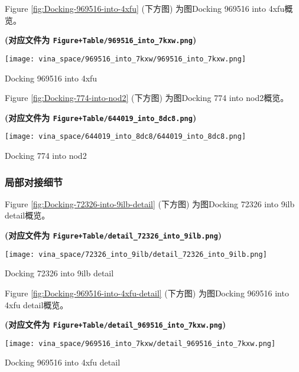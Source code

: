 \documentclass[
]{article}
\begin{document}
Figure \ref{fig:Docking-969516-into-4xfu} (下方图) 为图Docking 969516 into 4xfu概览。

\textbf{(对应文件为 \texttt{Figure+Table/969516\_into\_7kxw.png})}

\def\@captype{figure}
\begin{center}
\texttt{[image: vina\_space/969516\_into\_7kxw/969516\_into\_7kxw.png]}
\caption{Docking 969516 into 4xfu}\label{fig:Docking-969516-into-4xfu}
\end{center}

Figure \ref{fig:Docking-774-into-nod2} (下方图) 为图Docking 774 into nod2概览。

\textbf{(对应文件为 \texttt{Figure+Table/644019\_into\_8dc8.png})}

\def\@captype{figure}
\begin{center}
\texttt{[image: vina\_space/644019\_into\_8dc8/644019\_into\_8dc8.png]}
\caption{Docking 774 into nod2}\label{fig:Docking-774-into-nod2}
\end{center}

\hypertarget{ux5c40ux90e8ux5bf9ux63a5ux7ec6ux8282}{%
\subsubsection{局部对接细节}\label{ux5c40ux90e8ux5bf9ux63a5ux7ec6ux8282}}

Figure \ref{fig:Docking-72326-into-9ilb-detail} (下方图) 为图Docking 72326 into 9ilb detail概览。

\textbf{(对应文件为 \texttt{Figure+Table/detail\_72326\_into\_9ilb.png})}

\def\@captype{figure}
\begin{center}
\texttt{[image: vina\_space/72326\_into\_9ilb/detail\_72326\_into\_9ilb.png]}
\caption{Docking 72326 into 9ilb detail}\label{fig:Docking-72326-into-9ilb-detail}
\end{center}

Figure \ref{fig:Docking-969516-into-4xfu-detail} (下方图) 为图Docking 969516 into 4xfu detail概览。

\textbf{(对应文件为 \texttt{Figure+Table/detail\_969516\_into\_7kxw.png})}

\def\@captype{figure}
\begin{center}
\texttt{[image: vina\_space/969516\_into\_7kxw/detail\_969516\_into\_7kxw.png]}
\caption{Docking 969516 into 4xfu detail}\label{fig:Docking-969516-into-4xfu-detail}
\end{center}
\end{document}
